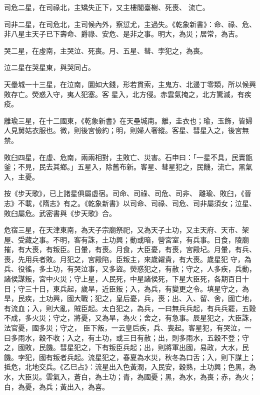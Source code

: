 \begin{pinyinscope}
 司危二星，在司祿北，主矯失正下，又主樓閣臺榭、死喪、
 流亡。



 司非二星，在司危北，主司候內外，察愆尤，主過失。《乾象新書》：命、祿、危、非八星主天子已下壽命、爵祿、安危、是非之事。明大，為災；居常，為吉。



 哭二星，在虛南，主哭泣、死喪。月、五星、彗、孛犯之，為喪。



 泣二星在哭星東，與哭同占。



 天壘城一十三星，在泣南，圜如大錢，形若貫索，主鬼方、北邊丁零類，所以候興敗存亡。熒惑入守，夷人犯塞。客
 星入，北方侵。赤雲氣掩之，北方驚滅，有疾疫。



 離瑜三星，在十二國東，《乾象新書》在天壘城南。離，圭衣也；瑜，玉飾，皆婦人見舅姑衣服也。微，則後宮儉約；明，則婦人奢縱。客星、彗星入之，後宮無禁。



 敗臼四星，在虛、危南，兩兩相對，主敗亡、災害。石申曰：「一星不具，民賣甑釜；不見，民去其鄉。」五星入，除舊布新。客星、彗星犯之，民饑，流亡。黑氣入，主憂。



 按《步天歌》，已上諸星俱屬虛宿。司命、司祿、司危、司非、
 離瑜、敗臼，《晉志》不載，《隋志》有之。《乾象新書》以司命、司祿、司危、司非屬須女；泣星、敗臼屬危。武密書與《步天歌》合。



 危宿三星，在天津東南，為天子宗廟祭祀，又為天子土功，又主天府、天市、架屋、受藏之事。不明，客有誅，土功興；動或暗，營宮室，有兵事。日食，陵廟摧，有大喪，有叛臣。日暈，有喪。月食，大臣憂，有喪，宮殿圮。月暈，有兵、喪，先用兵者敗。月犯之，宮殿陷，臣叛主，來歲糴貴，有大喪。歲星犯
 守，為兵、役徭，多土功，有哭泣事，又多盜。熒惑犯之，有赦；守之，人多疾，兵動，諸侯謀叛，宮中火災；守上星，人民死，中星諸侯死，下星大臣死，各期百日十日；守三十日，東兵起，歲旱，近臣叛；入，為兵，有變更之令。填星守之，為旱，民疾，土功興，國大戰；犯之，皇后憂，兵，喪；出、入、留、舍，國亡地，有流血；入，則大亂，賊臣起。太白犯之，為兵，一曰無兵兵起，有兵兵罷，五穀不成，多火災；守之，將憂，又為旱，為火；舍之，有急事。辰星犯之，大臣誅，法官憂，國多災；守之，
 臣下叛，一云皇后疾，兵、喪起。客星犯，有哭泣，一曰多雨水，穀不收；入之，有土功，或三日有赦；出，則多雨水，五穀不登；守之，國敗，民饑。彗星犯之，下有叛臣兵起；出，則將軍出國，易政，大水，民饑。孛犯，國有叛者兵起。流星犯之，春夏為水災，秋冬為口舌；入，則下謀上；抵危，北地交兵。《乙巳占》：流星出入色黃潤，入民安，穀熟，土功興；色黑，為水，大臣災。雲氣入，蒼白，為土功；青，為國憂；黑，為水，為喪；赤，為火；白，為憂，為兵；黃出入，為喜。




\end{pinyinscope}
